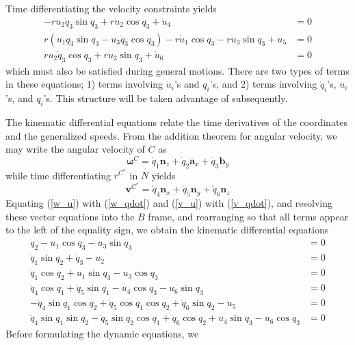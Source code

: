\documentclass[smallcondensed,final]{svjour3}                     %
\begin{document}
Time differentiating the velocity constraints yields
\begin{align}
-r u_2 \dot{q}_3 \sin q_3 + r \dot{u}_2 \cos q_3 + \dot{u}_4 &= 0 \\
r(u_1 \dot{q}_3 \sin q_3 - u_3 \dot{q}_3 \cos q_3) - r \dot{u}_1 \cos q_3 - r \dot{u}_3 \sin q_3 + \dot{u}_5 &= 0 \\
r u_2 \dot{q}_3 \cos q_3 + r \dot{u}_2 \sin q_3 + \dot{u}_6 &= 0
\end{align}
which must also be satisfied during general motions. There are two types of
terms in these equations; 1) terms involving $\dot{u}_i$'s and $q_i$'s, and 2)
terms involving $\dot{q}_i$'s, $u_i$'s, and $q_i$'s. This structure will be
taken advantage of subsequently.

The kinematic differential equations relate the time derivatives of the
coordinates and the generalized speeds. From the addition theorem for angular
velocity, we may write the angular velocity of $C$ as
\begin{equation}
  \label{w_qdot}
  \bm{\omega}^C = \dot{q}_1 \bm{n}_z + \dot{q}_2 \bm{a}_x + \dot{q}_3 \bm{b}_y
\end{equation}
while time differentiating $r^{C^*}$ in $N$ yields
\begin{equation}
  \label{v_qdot}
  \bm{v}^{C^*} = \dot{q}_4 \bm{n}_x + \dot{q}_5 \bm{n}_y + \dot{q}_6 \bm{n}_z
\end{equation}
Equating (\ref{w_u}) with (\ref{w_qdot}) and (\ref{v_u}) with (\ref{v_qdot}),
and resolving these vector equations into the $B$ frame, and rearranging so
that all terms appear to the left of the equality sign, we obtain the kinematic
differential equations
\begin{align}
  \dot{q}_2 - u_1 \cos q_3  - u_3 \sin q_3 &= 0 \\
  \dot{q}_1 \sin q_2 + \dot{q}_3 - u_2 &= 0 \\
  \dot{q}_1 \cos q_2 + u_1 \sin q_3  - u_3 \cos q_3  &= 0 \\
  \dot{q}_4 \cos q_1 + \dot{q}_5 \sin q_1 -u_4 \cos q_3 - u_6 \sin q_3 &= 0 \\
 -\dot{q}_4 \sin q_1 \cos q_2 + \dot{q}_5 \cos q_1 \cos q_2 + \dot{q}_6 \sin q_2 - u_5 &= 0 \\
  \dot{q}_4 \sin q_1 \sin q_2 - \dot{q}_5 \sin q_2 \cos q_1 + \dot{q}_6 \cos q_2 + u_4 \sin q_3 - u_6 \cos q_3 &= 0
\end{align}
Before formulating the dynamic equations, we 
\end{document}
